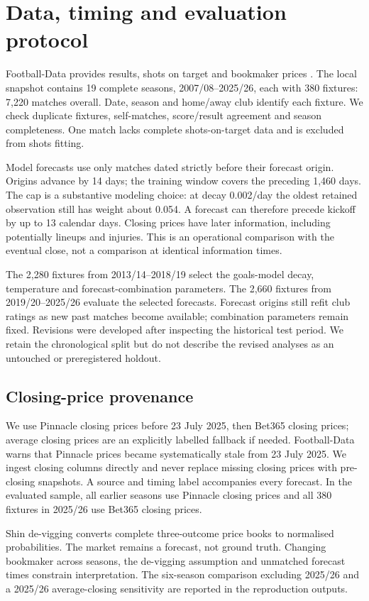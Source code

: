 \documentclass[11pt]{article}
\begin{document}
\section{Data, timing and evaluation protocol}
Football-Data provides results, shots on target and bookmaker prices
\citep{football-data}. The local snapshot contains 19 complete seasons,
2007/08--2025/26, each with 380 fixtures: 7,220 matches overall. Date, season and
home/away club identify each fixture. We check duplicate fixtures, self-matches,
score/result agreement and season completeness. One match lacks complete
shots-on-target data and is excluded from shots fitting.

Model forecasts use only matches dated strictly before their forecast origin.
Origins advance by 14 days; the training window covers the preceding 1,460 days.
The cap is a substantive modeling choice: at decay 0.002/day the oldest retained
observation still has weight about 0.054. A forecast can therefore precede
kickoff by up to 13 calendar days. Closing prices have later information,
including potentially lineups and injuries. This is an operational comparison
with the eventual close, not a comparison at identical information times.

The 2,280 fixtures from 2013/14--2018/19 select the goals-model decay,
temperature and forecast-combination parameters. The 2,660 fixtures from
2019/20--2025/26 evaluate the selected forecasts. Forecast origins still refit
club ratings as new past matches become available; combination parameters
remain fixed. Revisions were developed after inspecting the historical test
period. We retain the chronological split but do not describe the revised
analyses as an untouched or preregistered holdout.

\subsection{Closing-price provenance}
We use Pinnacle closing prices before 23 July 2025, then Bet365 closing prices;
average closing prices are an explicitly labelled fallback if needed.
Football-Data warns that Pinnacle prices became systematically stale from
23 July 2025. We ingest closing columns directly and never replace missing
closing prices with pre-closing snapshots. A source and timing label accompanies
every forecast. In the evaluated sample, all earlier seasons use Pinnacle
closing prices and all 380 fixtures in 2025/26 use Bet365 closing prices.

Shin de-vigging \citep{shin} converts complete three-outcome price books to
normalised probabilities. The market remains a forecast, not ground truth.
Changing bookmaker across seasons, the de-vigging assumption and unmatched
forecast times constrain interpretation. The six-season comparison excluding
2025/26 and a 2025/26 average-closing sensitivity are reported in the
reproduction outputs.
\end{document}
